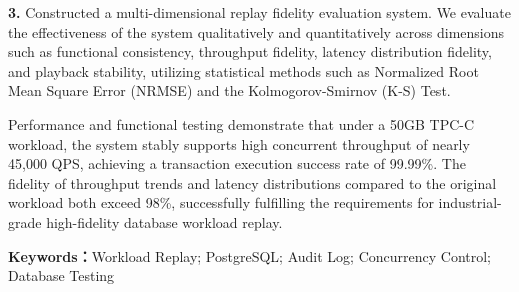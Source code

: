 \begin{enabstract}
\textbf{3.}
Constructed a multi-dimensional replay fidelity evaluation system. We evaluate the effectiveness of the system qualitatively and quantitatively across dimensions such as functional consistency, throughput fidelity, latency distribution fidelity, and playback stability, utilizing statistical methods such as Normalized Root Mean Square Error (NRMSE) and the Kolmogorov-Smirnov (K-S) Test.

Performance and functional testing demonstrate that under a 50GB TPC-C workload, the system stably supports high concurrent throughput of nearly 45,000 QPS, achieving a transaction execution success rate of 99.99\%. The fidelity of throughput trends and latency distributions compared to the original workload both exceed 98\%, successfully fulfilling the requirements for industrial-grade high-fidelity database workload replay.

\textbf{Keywords：}Workload Replay; PostgreSQL; Audit Log; Concurrency Control; Database Testing

\end{enabstract}






